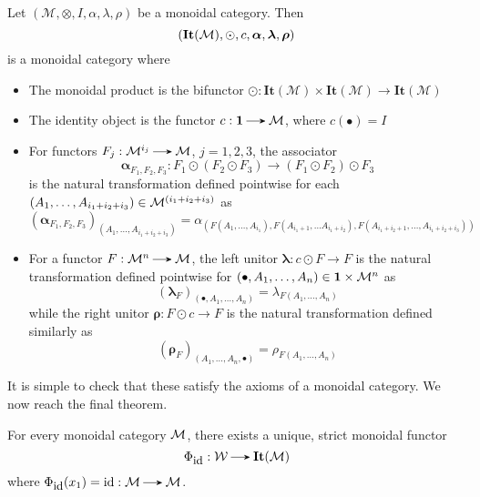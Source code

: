 \begin{lemma}\label{lemma:IT_is_monoidal}
    Let $(\mathcal{M}, \otimes, I, \alpha, \lambda, \rho)$ be a monoidal category. 
    Then 
    \[
        \left(\textbf{It}(\mathcal{M}), \odot, c, \bm{\alpha}, \bm{\lambda}, \bm{\rho}\right)
    \]
    is a monoidal category where 
    \begin{itemize}
        \item The monoidal product is the bifunctor
        $\odot: \textbf{It}(\mathcal{M})\times \textbf{It}(\mathcal{M}) \to 
        \textbf{It}(\mathcal{M})$
        \item The identity object is the functor $c: \textbf{1} \to \mm$, where $c(\bullet) = I$ 
        \item For functors $F_j: \mm^{i_j} \to \mm$, $j = 1, 2, 3$, the associator 
        \[
            \bm{\alpha}_{F_1, F_2, F_3}: F_1 \odot (F_2 \odot F_3) \to (F_1 \odot F_2) \odot F_3
        \]
        is the natural transformation defined pointwise for each $(A_1, \dots, A_{i_1 + i_2 + i_3}) \in 
        \mathcal{M}^{(i_1 + i_2 + i_3)}$ as 
        \[
            (\bm{\alpha}_{F_1, F_2, F_3})_{(A_1, \dots, A_{i_1 + i_2 + i_3})}
            =
            \alpha_{(F(A_1, \dots, A_{i_1}), F(A_{i_1 + 1}, \dots A_{i_1 + i_2}), F(A_{i_1 + i_2 + 1}, \dots, A_{i_1 + i_2 + i_3}))}
        \]
        \item For a functor $F: \mm^n \to \mm$, the left unitor $\bm{\lambda}: c \odot F \to F$ 
        is the natural transformation defined pointwise for $(\bullet, A_1, \dots, A_n) \in \textbf{1}\times \mathcal{M}^{n}$ as 
        \[
            (\bm{\lambda}_F)_{(\bullet, A_1, \dots, A_n)} = \lambda_{F(A_1, \dots, A_n)}
        \]
        while the right unitor $\bm{\rho}: F \odot c \to F$ 
        is the natural transformation defined similarly as
        \[
            (\bm{\rho}_F)_{(A_1, \dots, A_n, \bullet)} = \rho_{F(A_1, \dots, A_n)}
        \] 
    \end{itemize}

\end{lemma}

It is simple to check that these satisfy the axioms of a monoidal category. 
We now reach the final theorem.

\begin{theorem}\label{theorem:full_coherence_theorem}
    For every monoidal category $\mathcal{M}$, there exists a unique, 
    strict monoidal functor 
    \[
        \Phi_{\text{\small id}}: \ww \to \textbf{It}(\mm)
    \]
    where $\Phi_{\text{\small id}}(x_1) = \id: \mm \to \mm$.
   
\end{theorem}

